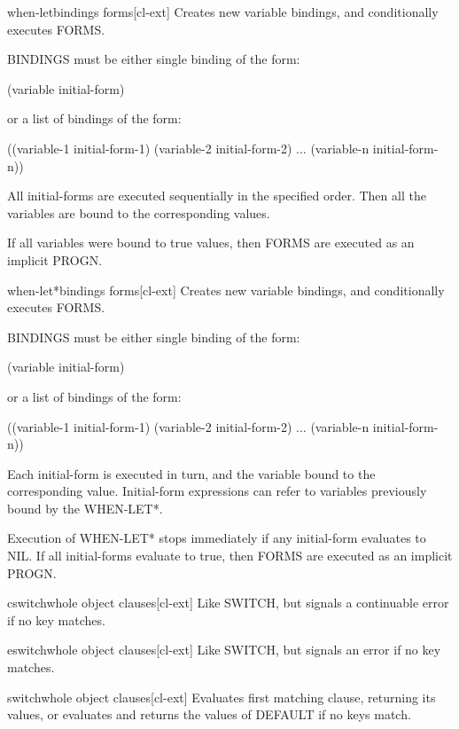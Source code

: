 \documentclass[10pt,english]{book}
\begin{document}
\begin{macro}{when-let}{bindings \body forms}[cl-ext]
  Creates new variable bindings, and conditionally executes FORMS.

BINDINGS must be either single binding of the form:

 (variable initial-form)

or a list of bindings of the form:

 ((variable-1 initial-form-1)
  (variable-2 initial-form-2)
  ...
  (variable-n initial-form-n))

All initial-forms are executed sequentially in the specified order. Then all
the variables are bound to the corresponding values.

If all variables were bound to true values, then FORMS are executed as an
implicit PROGN.
\end{macro}

\begin{macro}{when-let*}{bindings \body forms}[cl-ext]
  Creates new variable bindings, and conditionally executes FORMS.

BINDINGS must be either single binding of the form:

 (variable initial-form)

or a list of bindings of the form:

 ((variable-1 initial-form-1)
  (variable-2 initial-form-2)
  ...
  (variable-n initial-form-n))

Each initial-form is executed in turn, and the variable bound to the
corresponding value. Initial-form expressions can refer to variables
previously bound by the WHEN-LET*.

Execution of WHEN-LET* stops immediately if any initial-form evaluates to NIL.
If all initial-forms evaluate to true, then FORMS are executed as an implicit
PROGN.
\end{macro}

\begin{macro}{cswitch}{\whole whole object \body clauses}[cl-ext]
  Like SWITCH, but signals a continuable error if no key matches.
\end{macro}

\begin{macro}{eswitch}{\whole whole object \body clauses}[cl-ext]
  Like SWITCH, but signals an error if no key matches.
\end{macro}

\begin{macro}{switch}{\whole whole object \body clauses}[cl-ext]
  Evaluates first matching clause, returning its values, or evaluates and
returns the values of DEFAULT if no keys match.
\end{macro}
\end{document}
